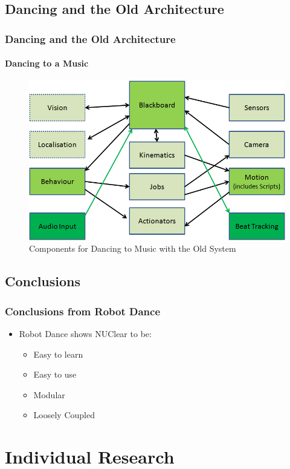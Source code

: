 \documentclass{beamer}
\begin{document}
	\subsection{Dancing and the Old Architecture} %
	\begin{frame}
		\frametitle{Dancing and the Old Architecture}
		\framesubtitle{Dancing to a Music}
		\begin{figure}
			\centering
			\includegraphics[scale=.45]{Presentation_Images/dance_audio_old_arc.png}
			\caption{Components for Dancing to Music with the Old System}
		\end{figure}
	\end{frame}	
	\subsection{Conclusions} %
	\begin{frame}
		\frametitle{Conclusions from Robot Dance}
			\begin{itemize}
				\item Robot Dance shows NUClear to be:
				\begin{itemize}
					\item Easy to learn
					\item Easy to use
					\item Modular
					\item Loosely Coupled
				\end{itemize}
			\end{itemize}
	\end{frame}	




\section{Individual Research}
\begin{frame}
	\sectionpage
\end{frame}
\end{document}
